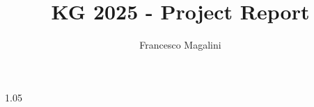 \documentclass{knowdive}
\title{KG 2025 - Project Report}
\author{Francesco Magalini}
\begin{document}
\maketitle
\begin{sloppypar}
\large
\begin{spacing}{1.05}











% 













\end{spacing}
\end{sloppypar}
\end{document}
